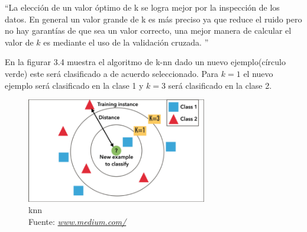 \textquotedblleft La elección de un valor óptimo de k se logra mejor por la inspección de los datos. En general un valor grande de k es más preciso ya que reduce el ruido pero no hay garantías de que sea un valor correcto, una mejor manera de calcular el valor de $k$ es mediante el uso de la validación cruzada.
\textquotedblright \cite{WEBSITE:7}

En la figurar 3.4 muestra el algoritmo de k-nn dado un nuevo ejemplo(círculo verde) este será clasificado a de acuerdo seleccionado. Para $k=1$ el nuevo ejemplo será clasificado en la clase 1 y $k=3$ será clasificado en la clase 2.
 \begin{figure}[H]
 	\centering
 	\includegraphics[width=0.7\textwidth]{Figures/knn.png}
 	\caption{knn \\ Fuente:  \href{https://medium.com/@adi.bronshtein/a-quick-introduction-to-k-nearest-neighbors-algorithm-62214cea29c7}{\textit{www.medium.com/}}}
 	\label{knn}
 \end{figure} 
